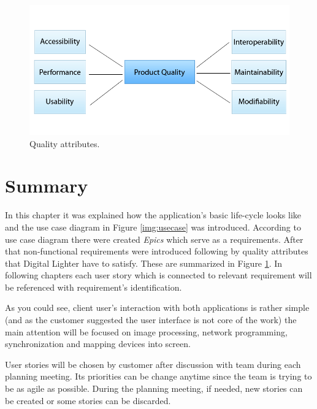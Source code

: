\begin{figure}[!ht]
    \begin{center}
    \includegraphics[scale=0.5]{requirements/quality.png}
    \caption{Quality attributes.}
    \label{img:qualityAttributes}
    \end{center}
\end{figure}

\section{Summary}
In this chapter it was explained how the application's basic life-cycle looks like and the use case diagram in Figure \ref{img:usecase} was introduced.
According to use case diagram there were created \emph{Epics} which serve as a requirements. 
After that non-functional requirements were introduced following by quality attributes that Digital Lighter have to satisfy.
These are summarized in Figure \ref{img:qualityAttributes}.
In following chapters each user story which is connected to relevant requirement will be referenced with requirement's identification.

As you could see, client user's interaction with both applications is rather simple (and as the customer suggested the user interface is not core of the work) the main attention will be focused on image processing, network programming, synchronization and mapping devices into screen.

User stories will be chosen by customer after discussion with team during each planning meeting.
Its priorities can be change anytime since the team is trying to be as agile as possible.
During the planning meeting, if needed, new stories can be created or some stories can be discarded.

